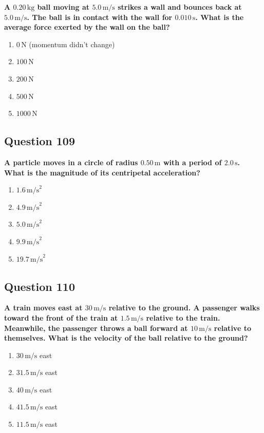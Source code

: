 \documentclass[12pt,letterpaper]{article}
\begin{document}
\begin{questionbox}
\textbf{A $0.20\,\text{kg}$ ball moving at $5.0\,\text{m/s}$ strikes a wall and bounces back at $5.0\,\text{m/s}$. The ball is in contact with the wall for $0.010\,\text{s}$. What is the average force exerted by the wall on the ball?}

\begin{enumerate}[label=\alph*)]
    \item $0\,\text{N}$ (momentum didn't change)
    \item $100\,\text{N}$
    \item $200\,\text{N}$
    \item $500\,\text{N}$
    \item $1000\,\text{N}$
\end{enumerate}
\end{questionbox}

\subsection{Question 109}

\begin{questionbox}
\textbf{A particle moves in a circle of radius $0.50\,\text{m}$ with a period of $2.0\,\text{s}$. What is the magnitude of its centripetal acceleration?}

\begin{enumerate}[label=\alph*)]
    \item $1.6\,\text{m/s}^2$
    \item $4.9\,\text{m/s}^2$
    \item $5.0\,\text{m/s}^2$
    \item $9.9\,\text{m/s}^2$
    \item $19.7\,\text{m/s}^2$
\end{enumerate}
\end{questionbox}

\subsection{Question 110}

\begin{questionbox}
\textbf{A train moves east at $30\,\text{m/s}$ relative to the ground. A passenger walks toward the front of the train at $1.5\,\text{m/s}$ relative to the train. Meanwhile, the passenger throws a ball forward at $10\,\text{m/s}$ relative to themselves. What is the velocity of the ball relative to the ground?}

\begin{enumerate}[label=\alph*)]
    \item $30\,\text{m/s}$ east
    \item $31.5\,\text{m/s}$ east
    \item $40\,\text{m/s}$ east
    \item $41.5\,\text{m/s}$ east
    \item $11.5\,\text{m/s}$ east
\end{enumerate}
\end{questionbox}
\end{document}
